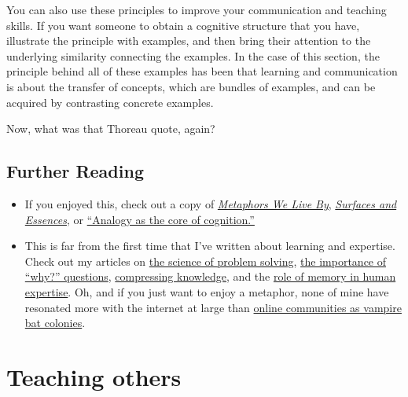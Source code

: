 You can also use these principles to improve your communication and
teaching skills. If you want someone to obtain a cognitive structure
that you have, illustrate the principle with examples, and then bring
their attention to the underlying similarity connecting the examples. In
the case of this section, the principle behind all of these examples has
been that learning and communication is about the transfer of concepts,
which are bundles of examples, and can be acquired by contrasting
concrete examples.

Now, what was that Thoreau quote, again?

\subsection{Further Reading}\label{further-reading}

\begin{itemize}
\itemsep1pt\parskip0pt
\item
  If you enjoyed this, check out a copy of
  \href{http://www.amazon.com/gp/product/0226468011/ref=as_li_tl?ie=UTF8\&camp=1789\&creative=390957\&creativeASIN=0226468011\&linkCode=as2\&tag=rsio-20}{\emph{Metaphors
  We Live By}},
  \href{http://www.amazon.com/gp/product/B00BE65086/ref=as_li_tl?ie=UTF8\&camp=1789\&creative=390957\&creativeASIN=B00BE65086\&linkCode=as2\&tag=rsio-20}{\emph{Surfaces
  and Essences}}, or
  \href{http://worrydream.com/refs/Hofstadter\%20-\%20Analogy\%20as\%20the\%20Core\%20of\%20Cognition.pdf}{``Analogy
  as the core of cognition.''}
\item
  This is far from the first time that I've written about learning and
  expertise. Check out my articles on
  \href{http://rs.io/2014/02/21/problem-solving.html}{the science of
  problem solving},
  \href{http://rs.io/2014/02/25/why-questions-reveal-structure.html}{the
  importance of ``why?'' questions},
  \href{http://rs.io/2014/02/24/compressing-knowledge.html}{compressing
  knowledge}, and the
  \href{http://rs.io/2014/01/20/human-expertise-and-memory-machines.html}{role
  of memory in human expertise}. Oh, and if you just want to enjoy a
  metaphor, none of mine have resonated more with the internet at large
  than
  \href{http://rs.io/2014/02/26/why-online-communities-decay-over-time.html}{online
  communities as vampire bat colonies}.
\end{itemize}

\section{Teaching others}

